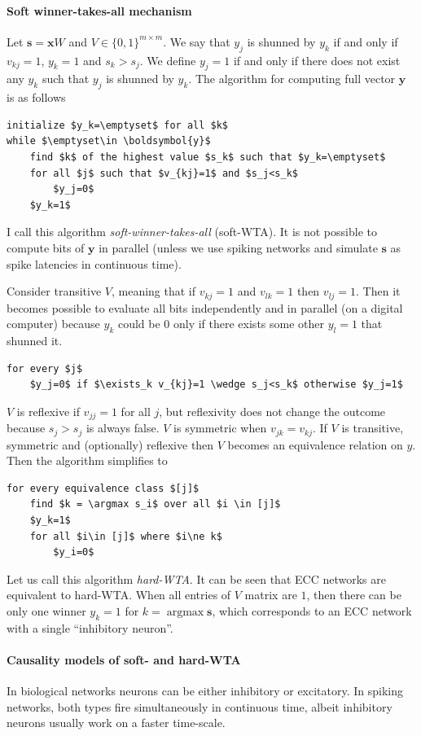 \documentclass[12pt]{article}
\DeclareMathOperator*{\argmax}{argmax}
\begin{document}
\paragraph{Soft winner-takes-all mechanism} 
Let $\boldsymbol{s}=\boldsymbol{x} W$ and $V\in \{0,1\}^{m\times m}$. 
 We say that $y_j$ is shunned by $y_k$ if and only if  $v_{kj}=1$, $y_k=1$ and $s_k>s_j$. We define $y_j=1$ if and only if there does not exist any $y_k$ such that  $y_j$ is shunned by $y_k$. The algorithm for computing full vector $\boldsymbol{y}$ is as follows
\begin{lstlisting}
initialize $y_k=\emptyset$ for all $k$
while $\emptyset\in \boldsymbol{y}$
    find $k$ of the highest value $s_k$ such that $y_k=\emptyset$
    for all $j$ such that $v_{kj}=1$ and $s_j<s_k$
        $y_j=0$ 
    $y_k=1$
\end{lstlisting}
I call this algorithm \textit{soft-winner-takes-all} (soft-WTA).
It is not possible to compute bits of $\boldsymbol{y}$ in parallel (unless we use spiking networks and simulate $\boldsymbol{s}$ as spike latencies in continuous time). 

 Consider transitive $V$, meaning that if $v_{kj}=1$ and $v_{lk}=1$ then $v_{lj}=1$. Then it becomes possible to evaluate all bits independently and in parallel (on a digital computer) because  $y_{k}$ could be $0$ only if there exists some other $y_l=1$ that shunned it.
\begin{lstlisting}
for every $j$
    $y_j=0$ if $\exists_k v_{kj}=1 \wedge s_j<s_k$ otherwise $y_j=1$
\end{lstlisting}
$V$ is reflexive if $v_{jj}=1$ for all $j$, but reflexivity does not change the outcome because $s_j > s_j$ is always false. $V$ is  symmetric when  $v_{jk}=v_{kj}$. If $V$ is transitive, symmetric and (optionally) reflexive then $V$ becomes an equivalence relation on $y$. Then the algorithm simplifies to
\begin{lstlisting}
for every equivalence class $[j]$
    find $k = \argmax s_i$ over all $i \in [j]$
    $y_k=1$ 
    for all $i\in [j]$ where $i\ne k$
        $y_i=0$ 
\end{lstlisting}
Let us call this algorithm \textit{hard-WTA}.
It can be seen that ECC networks are equivalent to hard-WTA.
When all entries of $V$ matrix are $1$, then there can be only one winner $y_k=1$ for $k=\argmax \boldsymbol{s}$, which corresponds to an ECC network with a single ``inhibitory neuron''. 

\paragraph{Causality models of soft- and hard-WTA}
In biological networks neurons can be either inhibitory or excitatory. In spiking networks, both types fire simultaneously in continuous time, albeit inhibitory neurons usually work on a faster time-scale. 
\end{document}
